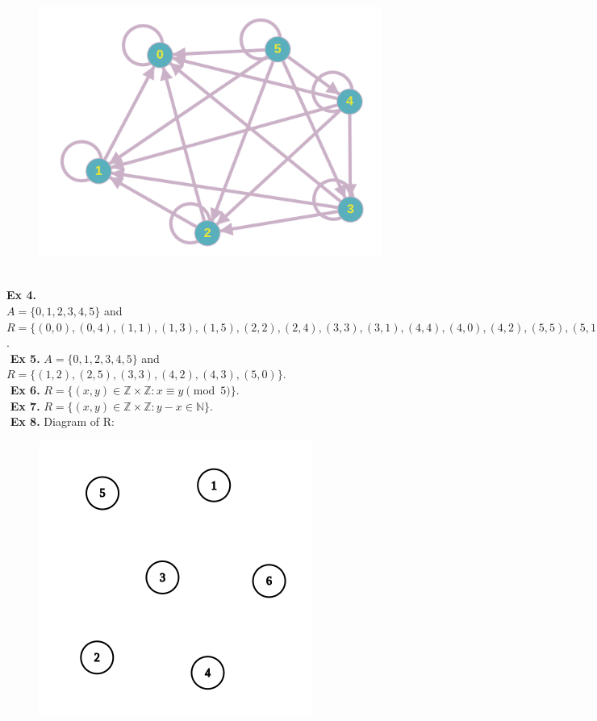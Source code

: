 \documentclass{article}
\begin{document}
\begin{figure}[h]
\centering
\includegraphics[scale=0.5]{3.png}
\end{figure}\\
\textbf{Ex 4.}\\
$A=\{0,1,2,3,4,5\}$ and $R=\{(0,0), (0,4), (1,1),(1,3),(1,5),(2,2),(2,4),(3,3),(3,1),(4,4),(4,0),(4,2),(5,5),(5,1)\}$.\\
$ $\newline
\textbf{Ex 5.}
$A=\{0,1,2,3,4,5\}$ and $R=\{(1,2), (2,5), (3,3), (4,2), (4,3),(5,0)\}$.\\
$ $\newline
\textbf{Ex 6.}
$R=\{ (x,y) \in \mathbb{Z} \times \mathbb{Z}: x \equiv y \pmod{5} \}$.\\
$ $\newline
\textbf{Ex 7.}
$R=\{ (x,y) \in \mathbb{Z} \times \mathbb{Z}: y-x \in \mathbb{N} \}$.\\
$ $\newline
\textbf{Ex 8.}
Diagram of R:
\begin{figure}[h]
\centering
\includegraphics[scale=0.5]{4.png}
\end{figure}
\end{document}
